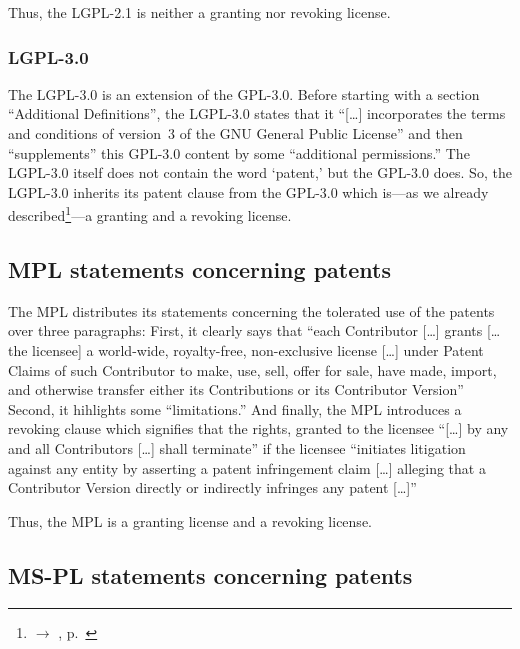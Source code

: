 Thus, the LGPL-2.1 is neither a granting nor revoking license.

\subsubsection {LGPL-3.0}\label{subsec:Lgpl30PatentClause}

The LGPL-3.0 is an extension of the GPL-3.0. Before starting with a section
\enquote{Additional Definitions}, the LGPL-3.0 states that it \enquote{[\ldots]
incorporates the terms and conditions of version~3 of the GNU General Public
License} and then \enquote{supplements} this GPL-3.0 content by some
\enquote{additional permissions.} The LGPL-3.0 itself does not
contain the word `patent,' but the GPL-3.0 does.
So, the LGPL-3.0 inherits its patent clause from the GPL-3.0 which is---as we
already described\footnote{$\rightarrow$ \oslic{}, p.\
\pageref{subsec:Gpl30PatentClause}}---a granting and a revoking license.
 
\subsection{MPL statements concerning patents}\label{subsec:MplPatentClause}

The MPL distributes its statements concerning the tolerated use of the patents
over three paragraphs: First, it clearly says that \enquote{each Contributor
[\ldots] grants [\ldots the licensee] a world-wide, royalty-free,
non-exclusive license [\ldots] under Patent Claims of such Contributor to
make, use, sell, offer for sale, have made, import, and otherwise transfer
either its Contributions or its Contributor Version}\citeMPL{§2.1,
esp. §2.1.b} Second, it hihlights some \enquote{limitations.}
And finally, the MPL introduces a revoking clause which signifies that the
rights, granted to the licensee \enquote{[\ldots] by any and all Contributors
[\ldots] shall terminate} if the licensee \enquote{initiates litigation
against any entity by asserting a patent infringement claim [\ldots] alleging
that a Contributor Version directly or indirectly infringes any patent
[\ldots]}\citeMPL{§5.2}

Thus, the MPL is a granting license and a revoking license.

\subsection{MS-PL statements concerning patents}\label{subsec:MsplPatentClause}

